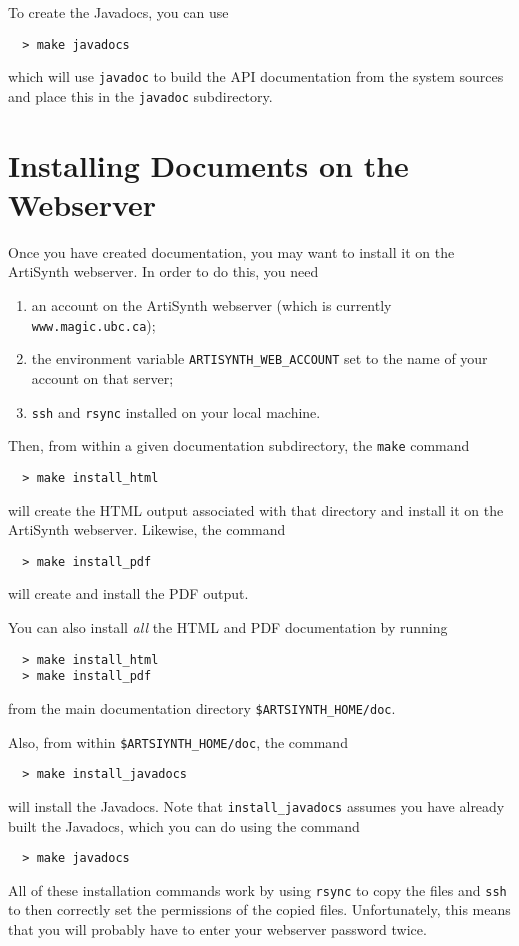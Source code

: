 \documentclass{article}
\begin{document}
To create the Javadocs, you can use
%
\begin{verbatim}
  > make javadocs
\end{verbatim}
%
which will use {\tt javadoc} to build the API documentation from
the system sources and place this in the {\tt javadoc} subdirectory.

\section{Installing Documents on the Webserver}
\label{InstallingSec}

Once you have created documentation, you may want to install it on the
ArtiSynth webserver. In order to do this, you need

\begin{enumerate}
\item an account on the ArtiSynth webserver (which is
currently {\tt www.magic.ubc.ca});
\item the environment variable {\tt ARTISYNTH\_WEB\_ACCOUNT} set to
the name of your account on that server;
\item {\tt ssh} and {\tt rsync} installed on your local machine.
\end{enumerate}

Then, from within a given documentation subdirectory, the {\tt make}
command
%
\begin {verbatim}
  > make install_html
\end{verbatim}
%
will create the HTML output associated with that directory and install
it on the ArtiSynth webserver. Likewise, the command
%
\begin {verbatim}
  > make install_pdf
\end{verbatim}
%
will create and install the PDF output.

You can also install {\it all} the HTML and PDF documentation 
by running 
%
\begin {verbatim}
  > make install_html
  > make install_pdf
\end{verbatim}
%
from the main documentation directory {\tt \$ARTSIYNTH\_HOME/doc}.

Also, from within {\tt \$ARTSIYNTH\_HOME/doc}, the command
%
\begin{verbatim}
  > make install_javadocs
\end{verbatim}
%
will install the Javadocs. Note that {\tt install\_javadocs} assumes you
have already built the Javadocs, which you can do using the command
%
\begin{verbatim}
  > make javadocs
\end{verbatim}
%
\begin{sideblock}
All of these installation commands work by using {\tt rsync}
to copy the files and
{\tt ssh} to then correctly set the permissions of the copied files.
Unfortunately, this means that you will probably have to enter your
webserver password twice.  
\end{sideblock}
\end{document}
